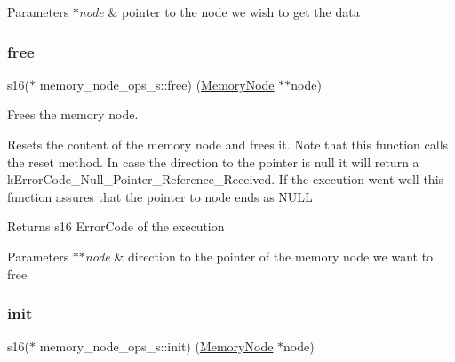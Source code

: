 \begin{DoxyParams}{Parameters}
{\em $\ast$node} & pointer to the node we wish to get the data \\
\hline
\end{DoxyParams}
\mbox{\label{structmemory__node__ops__s_a80866224e48d132a253baccc3543dda3}} 
\subsubsection{\texorpdfstring{free}{free}}
{\footnotesize\ttfamily s16($\ast$ memory\+\_\+node\+\_\+ops\+\_\+s\+::free) (\hyperlink{structmemory__node__s}{Memory\+Node} $\ast$$\ast$node)}



Frees the memory node. 

Resets the content of the memory node and frees it. Note that this function calls the reset method. In case the direction to the pointer is null it will return a k\+Error\+Code\+\_\+\+Null\+\_\+\+Pointer\+\_\+\+Reference\+\_\+\+Received. If the execution went well this function assures that the pointer to node ends as N\+U\+LL

\begin{DoxyReturn}{Returns}
s16 Error\+Code of the execution 
\end{DoxyReturn}

\begin{DoxyParams}{Parameters}
{\em $\ast$$\ast$node} & direction to the pointer of the memory node we want to free \\
\hline
\end{DoxyParams}
\mbox{\label{structmemory__node__ops__s_a9b50f77455ae67d99ce92e9fde94ae93}} 
\subsubsection{\texorpdfstring{init}{init}}
{\footnotesize\ttfamily s16($\ast$ memory\+\_\+node\+\_\+ops\+\_\+s\+::init) (\hyperlink{structmemory__node__s}{Memory\+Node} $\ast$node)}



